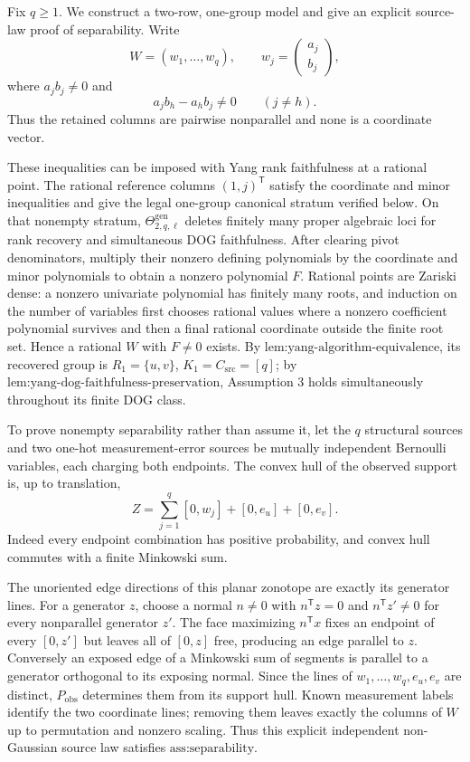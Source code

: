 Fix \(q\ge1\). We construct a two-row, one-group model and give an explicit source-law proof of separability. Write
\[
W=(w_1,\ldots,w_q),\qquad w_j=\begin{pmatrix}a_j\\b_j\end{pmatrix},
\]
where \(a_jb_j\ne0\) and
\[
a_jb_h-a_hb_j\ne0\qquad(j\ne h).
\]
Thus the retained columns are pairwise nonparallel and none is a coordinate vector.

These inequalities can be imposed with Yang rank faithfulness at a rational point. The rational reference columns \((1,j)^{\mathsf T}\) satisfy the coordinate and minor inequalities and give the legal one-group canonical stratum verified below. On that nonempty stratum, \(\Theta_{2,q,\ell}^{\mathrm{gen}}\) deletes finitely many proper algebraic loci for rank recovery and simultaneous DOG faithfulness. After clearing pivot denominators, multiply their nonzero defining polynomials by the coordinate and minor polynomials to obtain a nonzero polynomial \(F\). Rational points are Zariski dense: a nonzero univariate polynomial has finitely many roots, and induction on the number of variables first chooses rational values where a nonzero coefficient polynomial survives and then a final rational coordinate outside the finite root set. Hence a rational \(W\) with \(F\ne0\) exists. By \(\text{lem:yang-algorithm-equivalence}\), its recovered group is \(R_1=\{u,v\}\), \(K_1=C_{\mathrm{src}}=[q]\); by \(\text{lem:yang-dog-faithfulness-preservation}\), Assumption 3 holds simultaneously throughout its finite DOG class.

To prove nonempty separability rather than assume it, let the \(q\) structural sources and two one-hot measurement-error sources be mutually independent Bernoulli variables, each charging both endpoints. The convex hull of the observed support is, up to translation,
\[
Z=\sum_{j=1}^{q}[0,w_j]+[0,e_u]+[0,e_v].
\]
Indeed every endpoint combination has positive probability, and convex hull commutes with a finite Minkowski sum.

The unoriented edge directions of this planar zonotope are exactly its generator lines. For a generator \(z\), choose a normal \(n\ne0\) with \(n^{\mathsf T}z=0\) and \(n^{\mathsf T}z'\ne0\) for every nonparallel generator \(z'\). The face maximizing \(n^{\mathsf T}x\) fixes an endpoint of every \([0,z']\) but leaves all of \([0,z]\) free, producing an edge parallel to \(z\). Conversely an exposed edge of a Minkowski sum of segments is parallel to a generator orthogonal to its exposing normal. Since the lines of \(w_1,\ldots,w_q,e_u,e_v\) are distinct, \(P_{\mathrm{obs}}\) determines them from its support hull. Known measurement labels identify the two coordinate lines; removing them leaves exactly the columns of \(W\) up to permutation and nonzero scaling. Thus this explicit independent non-Gaussian source law satisfies \(\text{ass:separability}\).

